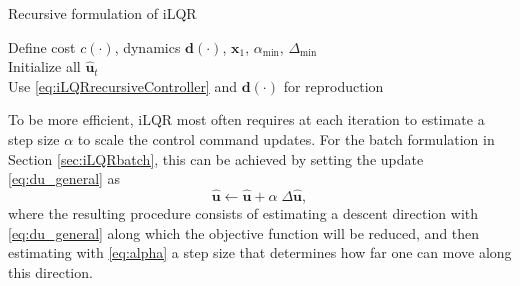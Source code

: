 \documentclass[10pt,a4paper]{article} %
\begin{document}
\begin{algorithm}
\caption{Recursive formulation of iLQR}
\label{alg:iLQRrecursive}
Define cost $c(\cdot)$, dynamics $\bm{d}(\cdot)$, $\bm{x}_1$, $\alpha_{\min}$, $\Delta_{\min}$ \\
Initialize all $\bm{\hat{u}}_t$ \\
Use \eqref{eq:iLQRrecursiveController} and $\bm{d}(\cdot)$ for reproduction \\
\end{algorithm}

To be more efficient, iLQR most often requires at each iteration to estimate a step size $\alpha$ to scale the control command updates.
For the batch formulation in Section \ref{sec:iLQRbatch}, this can be achieved by setting the update \eqref{eq:du_general} as
\begin{equation}
	\bm{\hat{u}} \leftarrow \bm{\hat{u}} + \alpha \; \Delta\bm{\hat{u}},
	\label{eq:alpha}
\end{equation}
where the resulting procedure consists of estimating a descent direction with \eqref{eq:du_general} along which the objective function will be reduced, and then estimating with \eqref{eq:alpha} a step size that determines how far one can move along this direction.
\end{document}
